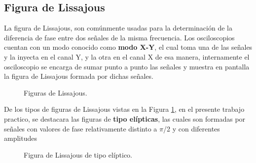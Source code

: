   \subsection{Figura de Lissajous}
               
      La figura de Lissajous, son comúnmente usadas para la determinación de la diferencia
      de fase entre dos señales de la misma frecuencia. Los osciloscopios cuentan con un modo
      conocido como \textbf{modo X-Y}, el cual toma una de las señales y la inyecta en el canal
      Y, y la otra en el canal X de esa manera, internamente el osciloscopio se encarga de 
      sumar punto a punto las señales y muestra en pantalla la figura de Lissajous formada por
      dichas señales.

         \begin{figure}[H]
            \centering
            \caption{Figuras de Lissajous.}
            \label{fig:LissajTipos}                 
         \end{figure}

      De los tipos de figuras de Lissajous vistas en la Figura \ref{fig:LissajTipos}, 
      en el presente trabajo practico, se destacara las figuras de \textbf{tipo elípticas}, 
      las cuales son formadas por señales con valores de fase relativamente distinto a $\pi$/2 
      y con diferentes amplitudes

      \begin{figure}[H]
         \centering
         \caption{Figura de Lissajous de tipo elíptico.}
         \label{fig:LissajElip}           
      \end{figure}

